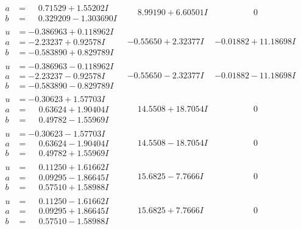 \documentclass[1p]{elsarticle_modified}
\theoremstyle{definition}
\begin{document}
$$\begin{array}{c|c|c}
\begin{aligned}
a &= \phantom{-}0.71529 + 1.55202 I \\
b &= \phantom{-}0.329209 - 1.303690 I\end{aligned}
 & \phantom{-}8.99190 + 6.60501 I & \phantom{-0.000000 } 0 \\ \hline\begin{aligned}
u &= -0.386963 + 0.118962 I \\
a &= -2.23237 + 0.92578 I \\
b &= -0.583890 + 0.829789 I\end{aligned}
 & -0.55650 + 2.32377 I & -0.01882 + 11.18698 I \\ \hline\begin{aligned}
u &= -0.386963 - 0.118962 I \\
a &= -2.23237 - 0.92578 I \\
b &= -0.583890 - 0.829789 I\end{aligned}
 & -0.55650 - 2.32377 I & -0.01882 - 11.18698 I \\ \hline\begin{aligned}
u &= -0.30623 + 1.57703 I \\
a &= \phantom{-}0.63624 + 1.90404 I \\
b &= \phantom{-}0.49782 - 1.55969 I\end{aligned}
 & \phantom{-}14.5508 + 18.7054 I & \phantom{-0.000000 } 0 \\ \hline\begin{aligned}
u &= -0.30623 - 1.57703 I \\
a &= \phantom{-}0.63624 - 1.90404 I \\
b &= \phantom{-}0.49782 + 1.55969 I\end{aligned}
 & \phantom{-}14.5508 - 18.7054 I & \phantom{-0.000000 } 0 \\ \hline\begin{aligned}
u &= \phantom{-}0.11250 + 1.61662 I \\
a &= \phantom{-}0.09295 - 1.86645 I \\
b &= \phantom{-}0.57510 + 1.58988 I\end{aligned}
 & \phantom{-}15.6825 - 7.7666 I & \phantom{-0.000000 } 0 \\ \hline\begin{aligned}
u &= \phantom{-}0.11250 - 1.61662 I \\
a &= \phantom{-}0.09295 + 1.86645 I \\
b &= \phantom{-}0.57510 - 1.58988 I\end{aligned}
 & \phantom{-}15.6825 + 7.7666 I & \phantom{-0.000000 } 0 \\ \hline\begin{aligned}

\end{aligned}
\end{array}$$
\end{document}
